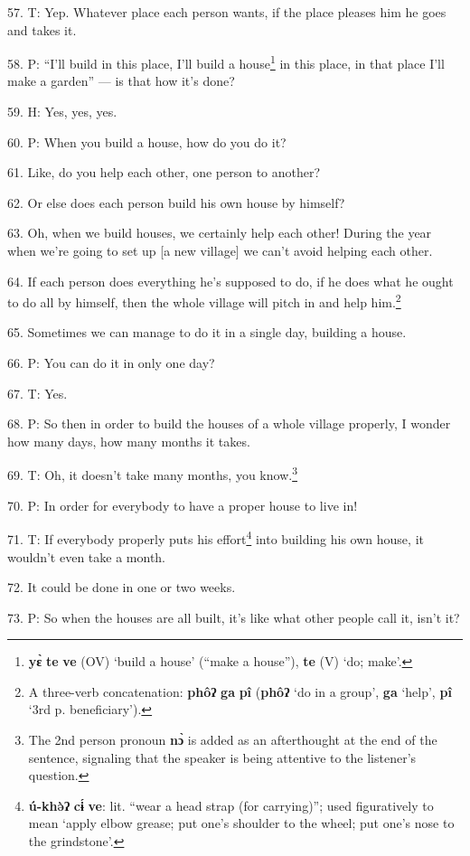 57. T: Yep. Whatever place each person wants, if the place pleases him he goes
and takes it.

58. P: ``I'll build in this place, I'll build a house\footnote{\textbf{yɛ̀} \textbf{te} \textbf{ve} (OV) `build a house' (``make a house''), \textbf{te} (V) `do; make'.} in this place, in that
place I'll make a garden'' --- is that how it's done?

59. H: Yes, yes, yes.

60. P: When you build a house, how do you do it?

61. Like, do you help each other, one person to another?

62. Or else does each person build his own house by himself?

63. Oh, when we build houses, we certainly help each other! During the year when
we're going to set up [a new village] we can't avoid helping each other.

64. If each person does everything he's supposed to do, if he does what he ought
to do all by himself, then the whole village will pitch in and help him.\footnote{A three-verb concatenation: \textbf{phôʔ} \textbf{ga} \textbf{pî} (\textbf{phôʔ} `do in a group', \textbf{ga} `help', \textbf{pî} `3rd p. beneficiary').}

65. Sometimes we can manage to do it in a single day, building a house.

66. P: You can do it in only one day?

67. T: Yes.

68. P: So then in order to build the houses of a whole village properly, I wonder
how many days, how many months it takes.

69. T: Oh, it doesn't take many months, you know.\footnote{The 2nd person pronoun \textbf{nɔ̀} is added as an afterthought at the end of the sentence, signaling that the speaker is being attentive to the listener's question.}

70. P: In order for everybody to have a proper house to live in!

71. T: If everybody properly puts his effort\footnote{\textbf{ú-khə̀ʔ} \textbf{cɨ́} \textbf{ve}: lit. ``wear a head strap (for carrying)''; used figuratively to mean `apply elbow grease; put one's shoulder to the wheel; put one's nose to the grindstone'.} into building his own house,
it wouldn't even take a month.

72. It could be done in one or two weeks.

73. P: So when the houses are all built, it's like what other people call it, isn't
it?


